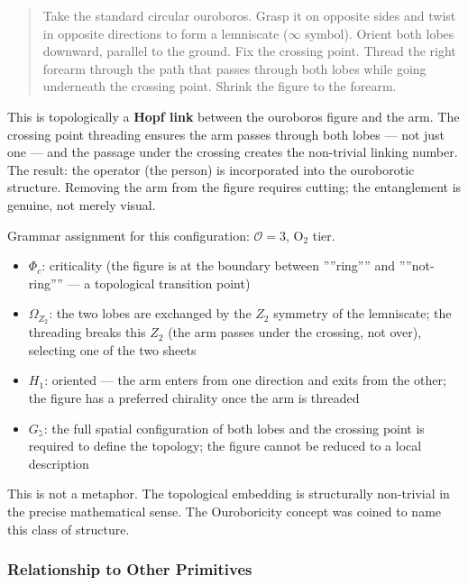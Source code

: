 \documentclass[12pt,a4paper]{article}
\begin{document}
\begin{quote}
Take the standard circular ouroboros. Grasp it on opposite sides and twist in opposite directions to form a lemniscate ($\infty$ symbol). Orient both lobes downward, parallel to the ground. Fix the crossing point. Thread the right forearm through the path that passes through both lobes while going underneath the crossing point. Shrink the figure to the forearm.

\end{quote}

This is topologically a \textbf{Hopf link} between the ouroboros figure and the arm. The crossing point threading ensures the arm passes through both lobes --- not just one --- and the passage under the crossing creates the non-trivial linking number. The result: the operator (the person) is incorporated into the ouroborotic structure. Removing the arm from the figure requires cutting; the entanglement is genuine, not merely visual.

Grammar assignment for this configuration: $\mathcal{O} = 3$, O$_2$ tier.

\begin{itemize}
    \item $\Phi_c$: criticality (the figure is at the boundary between ''''ring'''' and ''''not-ring'''' --- a topological transition point)
    \item $\Omega_{Z_2}$: the two lobes are exchanged by the $Z_2$ symmetry of the lemniscate; the threading breaks this $Z_2$ (the arm passes under the crossing, not over), selecting one of the two sheets
    \item $H_1$: oriented --- the arm enters from one direction and exits from the other; the figure has a preferred chirality once the arm is threaded
    \item $G_{\gimel}$: the full spatial configuration of both lobes and the crossing point is required to define the topology; the figure cannot be reduced to a local description
\end{itemize}

This is not a metaphor. The topological embedding is structurally non-trivial in the precise mathematical sense. The Ouroboricity concept was coined to name this class of structure.

\subsubsection{Relationship to Other Primitives}
\end{document}
